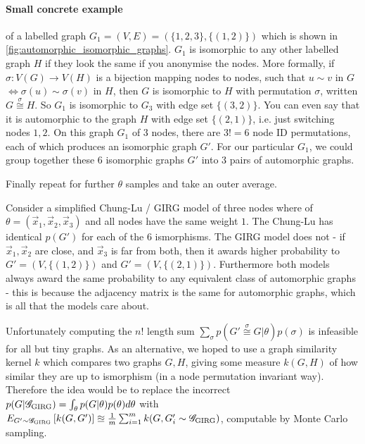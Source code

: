 \paragraph{Small concrete example} of a labelled graph $G_1 = (V, E) = (\{1, 2, 3\}, \{(1,2)\})$ which is shown in \cref{fig:automorphic_isomorphic_graphs}. $G_1$ is isomorphic to any other labelled graph $H$ if they look the same if you anonymise the nodes.
More formally, if $\sigma: V(G) \to V(H)$ is a bijection mapping nodes to nodes, such that $u \sim v$ in $G$ $\iff \sigma(u) \sim \sigma(v)$ in $H$, then $G$ is isomorphic to $H$ with permutation $\sigma$, written $G \stackrel{\sigma}{\cong} H$.
So $G_1$ is isomorphic to $G_3$ with edge set $\{(3,2)\}$. You can even say that it is automorphic to the graph $H$ with edge set $\{(2, 1)\}$, i.e. just switching nodes $1,2$.
On this graph $G_1$ of 3 nodes, there are $3! = 6$ node ID permutations, each of which produces an isomorphic graph $G'$. For our particular $G_1$, we could group together these 6 isomorphic graphs $G'$ into 3 pairs of automorphic graphs.

Finally repeat for further $\theta$ samples and take an outer average.


Consider a simplified Chung-Lu / GIRG model of three nodes where of $\theta = (\vec{x}_1, \vec{x}_2, \vec{x}_3)$ and all nodes have the same weight $1$.
The Chung-Lu has identical $p(G')$ for each of the 6 ismorphisms.
The GIRG  model does not - if $\vec{x}_1, \vec{x}_2$ are close, and $\vec{x}_3$ is far from both, then it awards higher probability to $G' = (V, \{(1,2)\})$ and $G' = (V, \{(2, 1)\})$.
Furthermore both models always award the same probability to any equivalent class of automorphic graphs - this is because the adjacency matrix is the same for automorphic graphs, which is all that the models care about.

Unfortunately computing the $n!$ length sum $\sum_{\sigma} p(G' \stackrel{\sigma}{\cong} G | \theta) p(\sigma)$ is infeasible for all but tiny graphs. As an alternative, we hoped to use a graph similarity kernel $k$ which compares two graphs $G, H$, giving some measure $k(G, H)$ of how similar they are up to ismorphism (in a node permutation invariant way).
Therefore the idea would be to replace the incorrect $p(G | \mathscr{G}_{\mathrm{GIRG}}) = \int_\theta p(G | \theta) p(\theta) d\theta$ with 
$E_{G' \sim \mathscr{G}_{\mathrm{GIRG}}} \left [ k(G, G') \right ]\approxeq \frac{1}{m} \sum_{i=1}^m k(G, G'_i \sim \mathscr{G}_{\mathrm{GIRG}})$, computable by Monte Carlo sampling.

